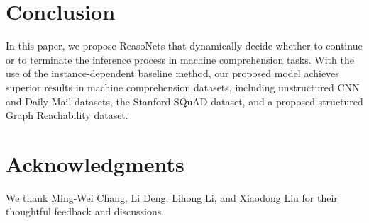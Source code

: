 \documentclass[sigconf]{acmart}
\begin{document}
\section{Conclusion}
In this paper, we propose ReasoNets that dynamically decide whether to continue or to terminate the inference process in machine comprehension tasks.
With the use of the instance-dependent baseline method, our proposed model achieves superior results in machine comprehension datasets, including unstructured CNN and Daily Mail datasets, the Stanford SQuAD dataset, and a proposed structured Graph Reachability dataset.

\section{Acknowledgments}
We thank Ming-Wei Chang, Li Deng, Lihong Li, and Xiaodong Liu for their thoughtful feedback and discussions. 
%


{%
}


%
%


 
\end{document}
